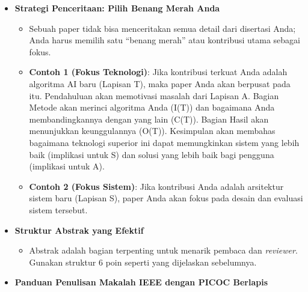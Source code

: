 \documentclass[
  letterpaper,
  DIV=11,
  numbers=noendperiod]{scrreprt}
\providecommand{\tightlist}{%
  \setlength{\itemsep}{0pt}\setlength{\parskip}{0pt}}
\begin{document}
\begin{itemize}
\tightlist
\item
  \textbf{Strategi Penceritaan: Pilih Benang Merah Anda}

  \begin{itemize}
  \tightlist
  \item
    Sebuah paper tidak bisa menceritakan semua detail dari disertasi
    Anda; Anda harus memilih satu ``benang merah'' atau kontribusi utama
    sebagai fokus.
  \item
    \textbf{Contoh 1 (Fokus Teknologi)}: Jika kontribusi terkuat Anda
    adalah algoritma AI baru (Lapisan T), maka paper Anda akan berpusat
    pada itu. Pendahuluan akan memotivasi masalah dari Lapisan A. Bagian
    Metode akan merinci algoritma Anda (I(T)) dan bagaimana Anda
    membandingkannya dengan yang lain (C(T)). Bagian Hasil akan
    menunjukkan keunggulannya (O(T)). Kesimpulan akan membahas bagaimana
    teknologi superior ini dapat memungkinkan sistem yang lebih baik
    (implikasi untuk S) dan solusi yang lebih baik bagi pengguna
    (implikasi untuk A).
  \item
    \textbf{Contoh 2 (Fokus Sistem)}: Jika kontribusi Anda adalah
    arsitektur sistem baru (Lapisan S), paper Anda akan fokus pada
    desain dan evaluasi sistem tersebut.
  \end{itemize}
\item
  \textbf{Struktur Abstrak yang Efektif}

  \begin{itemize}
  \tightlist
  \item
    Abstrak adalah bagian terpenting untuk menarik pembaca dan
    \emph{reviewer}. Gunakan struktur 6 poin seperti yang dijelaskan
    sebelumnya.
  \end{itemize}
\item
  \textbf{Panduan Penulisan Makalah IEEE dengan PICOC Berlapis}


\end{itemize}
\end{document}
